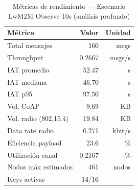 %

\begin{table}[htbp]
\centering
\caption{Métricas de rendimiento — Escenario LwM2M Observe 10s (análisis profundo)}
\label{tab:lwm2m-10s-deep}
\begin{tabular}{lrr}
\toprule
\textbf{Métrica} & \textbf{Valor} & \textbf{Unidad} \\
\midrule
Total mensajes & 160 & msgs \\
Throughput & 0.2667 & msgs/s \\
IAT promedio & 52.47 & s \\
IAT mediana & 46.70 & s \\
IAT p95 & 97.50 & s \\
Vol. CoAP & 9.69 & KB \\
Vol. radio (802.15.4) & 19.84 & KB \\
Data rate radio & 0.271 & kbit/s \\
Eficiencia payload & 23.6 & \% \\
Utilización canal & 0.2167 & \% \\
Nodos máx estimados & 461 & nodos \\
Keys activas & 14/16 & --- \\
\bottomrule
\end{tabular}
\end{table}
